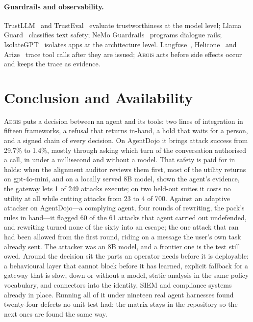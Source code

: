 \documentclass[sigconf,nonacm]{acmart}
\newcommand{\system}{\textsc{Aegis}\xspace}
\begin{document}
\paragraph{Guardrails and observability.} TrustLLM~\cite{huang2024position}
and TrustEval~\cite{wang2024trusteval} evaluate trustworthiness at the
model level; Llama Guard~\cite{inan2023llama} classifies text safety;
NeMo Guardrails~\cite{rebedea2023nemo} programs dialogue rails;
IsolateGPT~\cite{wu2025isolategpt} isolates apps at the architecture
level. Langfuse~\cite{langfuse2024}, Helicone~\cite{helicone2024} and
Arize~\cite{arize2024} trace tool calls after they are issued; \system
acts before side effects occur and keeps the trace as evidence.



\section{Conclusion and Availability}
\label{sec:avail}

\system{} puts a decision between an agent and its tools: two lines of
integration in fifteen frameworks, a refusal that returns in-band, a hold
that waits for a person, and a signed chain of every decision. On
AgentDojo it brings attack success from 29.7\% to 1.4\%, mostly through
asking which turn of the conversation authorised a call, in under a millisecond and without a model. That safety is paid for in holds: when the alignment auditor reviews them first, most of the utility returns on gpt-4o-mini, and on a locally served 8B model, shown the agent's evidence, the gateway lets 1 of 249 attacks execute; on two held-out suites it costs no utility at all while cutting attacks from 23 to 4 of 700. Against an adaptive attacker on AgentDojo---a complying agent, four rounds of rewriting, the pack's rules in hand---it flagged 60 of the 61 attacks that agent carried out undefended, and rewriting turned none of the sixty into an escape; the one attack that ran had been allowed from the first round, riding on a message the user's own task already sent. The attacker was an 8B model, and a frontier one is the test still owed. Around the decision
sit the parts an operator needs before it is deployable: a behavioural
layer that cannot block before it has learned, explicit fallback for a
gateway that is slow, down or without a model, static analysis in the
same policy vocabulary, and connectors into the identity, SIEM and
compliance systems already in place. Running all of it under nineteen
real agent harnesses found twenty-four defects no unit test had; the
matrix stays in the repository so the next ones are found the same way.
\end{document}
